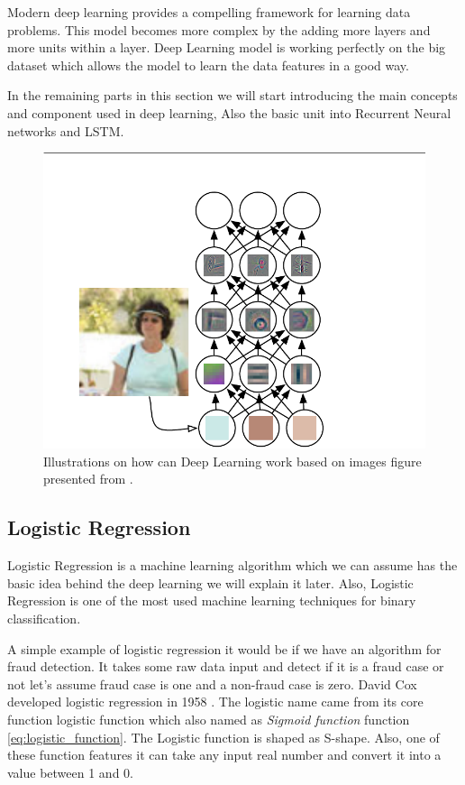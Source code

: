       
Modern deep learning provides a compelling framework for learning data problems. This model becomes more complex by the adding more layers and more units within a layer. Deep Learning model is working perfectly on the big dataset which allows the model to learn the data features in a good way.


In the remaining parts in this section we will start introducing the main concepts and component used in deep learning, Also the basic unit into Recurrent Neural networks and LSTM.

      
\begin{figure}[h!] \includegraphics[width=\linewidth]{./Figures/DeepLearningImagePersonExample.png}
  \caption{Illustrations on how can Deep Learning work based on images figure presented from \cite{Goodfellow-et-al-2016} \cite{Zeiler2014}.}
  \label{fig:DeepLearningImagePersonExample.png}
\end{figure}


\newpage
\subsection{Logistic Regression}
Logistic Regression is a machine learning algorithm which we can assume has the basic idea behind the deep learning we will explain it later. Also, Logistic Regression is one of the most used machine learning techniques for binary classification.

A simple example of logistic regression it would be if we have an algorithm for fraud detection. It takes some raw data input and detect if it is a fraud case or not let’s assume fraud case is one and a non-fraud case is zero. David Cox developed logistic regression in 1958 \cite{Cox2958}. The logistic name came from its core function logistic function which also named as \textit{Sigmoid function}  function \eqref{eq:logistic_function}. The Logistic function is shaped as S-shape. %
Also, one of these function features it can take any input real number and convert it into a value between 1 and 0.

